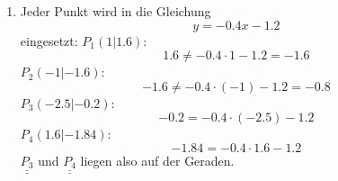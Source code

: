 \documentclass[%
11pt,%
twoside,%
titlepage,%
german,%
headsepline%
]{scrartcl}
\newcommand{\result}[1]{\underline{\underline{#1}}}
\begin{document}
{{{\begin{enumerate}
\begin{enumerate}
  \item $b=-1$
    \begin{eqnarray*}
      a & = & \frac{-2-(-1)}{1-0}=-1 \\
      y & = & \result{-x-1}
    \end{eqnarray*}
  \item $b=2.6$
    \begin{eqnarray*}
      a & = & \frac{-0.8-2.6}{1-0}=-3.4 \\
      y & = & \result{-3.4x+2.6}
    \end{eqnarray*}
\end{enumerate}


\item Jeder Punkt wird in die Gleichung
  \begin{displaymath}
    y=-0.4x-1.2
  \end{displaymath}
  eingesetzt: $P_1(1|1.6)$:
  \begin{displaymath}
    1.6 \neq -0.4 \cdot 1 - 1.2 = -1.6
  \end{displaymath}
$P_2(-1|-1.6)$:
\begin{displaymath}
  -1.6 \neq -0.4 \cdot (-1) - 1.2 = -0.8
\end{displaymath}
 $P_3(-2.5|-0.2)$:
 \begin{displaymath}
   -0.2 = -0.4 \cdot (-2.5) - 1.2
 \end{displaymath}
$P_4(1.6|-1.84)$:
\begin{displaymath}
  -1.84 = -0.4 \cdot 1.6 - 1.2
\end{displaymath}
$\result{P_3}$ und $\result{P_4}$ liegen also auf der Geraden.



\end{enumerate}}}}
\end{document}
